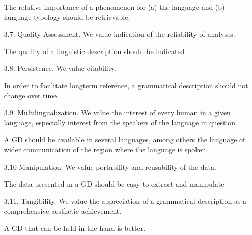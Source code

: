 \begin{enumerate}
\ea  The relative importance of a phenomenon for (a) the language and (b) language typology should be retrievable. \z

\item[3.7.] Quality Assessment. We value indication of the reliability of analyses.

\ea  The quality of a linguistic description should be indicated \z

\item[3.8.] Persistence. We value citability.

\ea  In order to facilitate longterm reference, a grammatical description should not change over time. \z

\item[3.9.] Multilingualization. We value the interest of every human in a given language, especially interest from the speakers of the language in question.

\ea  A GD should be available in several languages, among others the language of wider communication of the region where the language is spoken. \z

\item[3.10] Manipulation. We value portability and reusability of the data.

\ea  The data presented in a GD should be easy to extract and manipulate \z

\item[3.11.] Tangibility. We value the appreciation of a grammatical description as a comprehensive aesthetic achievement.

\ea  A GD that can be held in the hand is better. \z
\end{enumerate}
